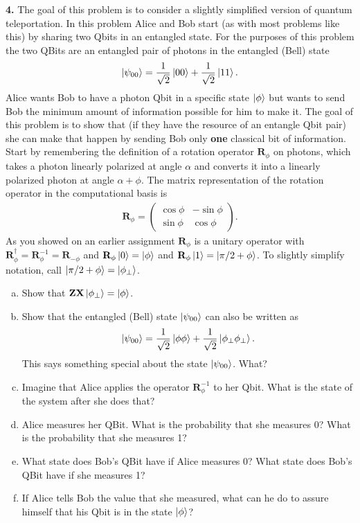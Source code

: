 \documentclass{book}
\theoremstyle{definition}
\newcommand{\al}{\alpha}
\newcommand{\X}{\mathbf{X}}
\newcommand{\f}[2]{\frac{#1}{#2}}
\newcommand{\Z}{\mathbf{Z}}
\begin{document}
\newpage
\noindent \textbf{4.} The goal of this problem is to consider a slightly simplified version of quantum teleportation. In this problem Alice and Bob start (as with most problems like this) by sharing two Qbits
in an entangled state. For the purposes of this problem the two QBits are an entangled pair of photons in the entangled (Bell) state
\begin{align}
\ket{\psi_{00}} = \f{1}{\sqrt{2}}\ket{00} + \f{1}{\sqrt{2}}\ket{11}.
\end{align}
Alice wants Bob to have a photon Qbit in a specific state $\ket{\phi}$ but wants to send Bob the
minimum amount of information possible for him to make it. The goal of this problem is to
show that (if they have the resource of an entangle Qbit pair) she can make that happen by
sending Bob only \textbf{one} classical bit of information.\\

\noindent Start by remembering the definition of a rotation operator $\mathbf{R}_\phi$ on photons, which takes a photon linearly polarized at angle $\al$ and converts it into a linearly polarized photon at angle
$\al + \phi$. The matrix representation of the rotation operator in the computational basis is
\begin{align}
\mathbf{R}_\phi = \begin{pmatrix}
\cos\phi & -\sin\phi \\ \sin\phi & \cos\phi
\end{pmatrix}.
\end{align}
As you showed on an earlier assignment $\mathbf{R}_\phi$ is a unitary operator with $\mathbf{R}_\phi^\dagger = \mathbf{R}^{-1}_\phi = \mathbf{R}_{-\phi}$ and $\mathbf{R}_\phi \ket{0} = \ket{\phi}$ and $\mathbf{R}_\phi \ket{1} = \ket{\pi/2 + \phi}$. To slightly simplify notation, call $\ket{\pi/2 + \phi} = \ket{\phi_\perp}$. 
\begin{enumerate}[(a)]
	\item Show that $ \Z \X\ket{\phi_\perp} = \ket{\phi}$.
	\item Show that the entangled (Bell) state $\ket{\psi_{00}}$ can also be written as 
	\begin{align}
	\ket{\psi_{00}} = \f{1}{\sqrt{2}}\ket{\phi\phi} + \f{1}{\sqrt{2}}\ket{\phi_\perp \phi_\perp}.
	\end{align}
	This says something special about the state $\ket{\psi_{00}}$. What? 
	\item Imagine that Alice applies the operator $\mathbf{R}_\phi^{-1}$ to her Qbit. What is the state of the system after she does that?
	\item Alice measures her QBit. What is the probability that she measures 0? What is the
	probability that she measures 1?
	\item What state does Bob’s QBit have if Alice measures 0? What state does Bob’s QBit have
	if she measures 1?
	\item If Alice tells Bob the value that she measured, what can he do to assure himself that his
	Qbit is in the state $\ket{\phi}$? 
\end{enumerate}
\end{document}
